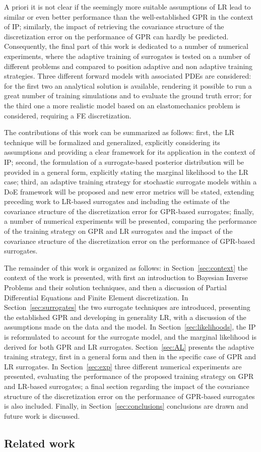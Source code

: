 A priori it is not clear if the seemingly more suitable assumptions of LR lead to similar or even better performance than the well-established GPR in the context of IP; similarly, the impact of retrieving the covariance structure of the discretization error on the performance of GPR can hardly be predicted.
Consequently, the final part of this work is dedicated to a number of numerical experiments, where the adaptive training of surrogates is tested on a number of different problems and compared to position adaptive and non adaptive training strategies.
Three different forward models with associated PDEs are considered: for the first two an analytical solution is available, rendering it possible to run a great number of training simulations and to evaluate the ground truth error; for the third one a more realistic model based on an elastomechanics problem is considered, requiring a FE discretization.\medskip

The contributions of this work can be summarized as follows: first, the LR technique will be formalized and generalized, explicitly considering its assumptions and providing a clear framework for its application in the context of IP; second, the formulation of a surrogate-based posterior distribution will be provided in a general form, explicitly stating the marginal likelihood to the LR case; third, an adaptive training strategy for stochastic surrogate models within a DoE framework will be proposed and new error metrics will be stated, extending preceding work to LR-based surrogates and including the estimate of the covariance structure of the discretization error for GPR-based surrogates; finally, a number of numerical experiments will be presented, comparing the performance of the training strategy on GPR and LR surrogates and the impact of the covariance structure of the discretization error on the performance of GPR-based surrogates.\medskip

The remainder of this work is organized as follows: in Section~\ref{sec:context} the context of the work is presented, with first an introduction to Bayesian Inverse Problems and their solution techniques, and then a discussion of Partial Differential Equations and Finite Element discretization.
In Section~\ref{sec:surrogates} the two surrogate techniques are introduced, presenting the established GPR and developing in generality LR, with a discussion of the assumptions made on the data and the model.
In Section~\ref{sec:likelihoods}, the IP is reformulated to account for the surrogate model, and the marginal likelihood is derived for both GPR and LR surrogates.
Section~\ref{sec:AL} presents the adaptive training strategy, first in a general form and then in the specific case of GPR and LR surrogates.
In Section~\ref{sec:exp} three different numerical experiments are presented, evaluating the performance of the proposed training strategy on GPR and LR-based surrogates; a final section regarding the impact of the covariance structure of the discretization error on the performance of GPR-based surrogates is also included.
Finally, in Section~\ref{sec:conclusions} conclusions are drawn and future work is discussed.

\subsection{Related work}\label{sec:literature}
